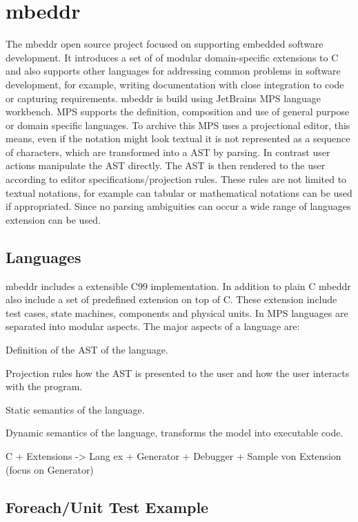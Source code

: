 \section{mbeddr}


The mbeddr open source project focused on supporting embedded software development. It introduces a set of of modular domain-specific extensions to C and also supports other languages for addressing common problems in software development, for example, writing documentation with close integration to code or capturing requirements. mbeddr is build using JetBrains \ac{MPS} language workbench. \ac{MPS} supports the definition, composition and use of general purpose or domain specific languages. To archive this \ac{MPS} uses a projectional editor, this means, even if the notation might look textual it is not represented as a sequence of characters, which are transformed into a \ac{AST} by parsing. In contrast user actions manipulate the \ac{AST} directly. The \ac{AST} is then rendered to the user according to editor specifications/projection rules. These rules are not limited to textual notations, for example can tabular or mathematical notations can be used if appropriated. Since no parsing ambiguities can occur a wide range of languages extension can be used.


\subsection{Languages}
mbeddr includes a extensible C99 implementation. In addition to plain C mbeddr also include a set of predefined extension on top of C. These extension include test cases, state machines, components and physical units. In \ac{MPS} languages are separated into modular aspects. The major aspects of a language are:  

 Definition of the \ac{AST} of the language.

 Projection rules how the \ac{AST} is presented to the user and how the user interacts with the program.

 Static semantics of the language.
 
 Dynamic semantics of the language, transforms the model into executable code.


C + Extensions 
	    -> Lang ex +  Generator + Debugger
		+ Sample von Extension (focus on Generator)
		
\subsection{Foreach/Unit Test Example}
